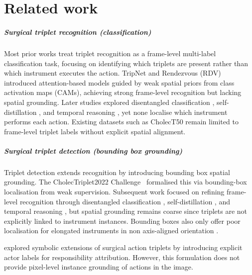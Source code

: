 \documentclass[pdflatex,sn-mathphys-num]{sn-jnl}%
\newcommand{\mysubsection}[1]{\subparagraph{#1}}
\newcommand{\revref}[2]{%
  \marginpar{\raggedright$\scriptstyle R_{#1}C_{#2}$}%
}
\DeclareRobustCommand{\robustrevref}[2]{%
\revref{#1}{#2}
}
\newcommand{\revnew}[1]{%
{\color{orange}#1}\xspace
}
\newcommand{\revref}[2]{\ignorespaces}
\newcommand{\robustrevref}[2]{\ignorespaces}
\newcommand{\revnew}[1]{#1\xspace}
\theoremstyle{thmstyleone}%
\theoremstyle{thmstyletwo}%
\theoremstyle{thmstylethree}%
\begin{document}
\section{Related work}\label{sec::related_works}

\mysubsection{Surgical triplet recognition (classification)} 
Most prior works treat triplet recognition as a frame-level multi-label classification task, focusing on identifying which triplets are present rather than which instrument executes the action. 
TripNet \cite{nwoye2020recognition} and Rendezvous (RDV) \cite{nwoye2022rendezvous} introduced attention-based models guided by weak spatial priors from class activation maps (CAMs), achieving strong frame-level recognition but lacking spatial grounding. 
Later studies explored disentangled classification \cite{chen2023surgical}, self-distillation \cite{yamlahi2023self}, and temporal reasoning \cite{sharma2023rendezvous}, yet none localise which instrument performs each action. 
Existing datasets such as CholecT50 \cite{nwoye2022rendezvous} remain limited to frame-level triplet labels without explicit spatial alignment. 


\mysubsection{Surgical triplet detection (bounding box grounding)}
Triplet detection extends recognition by introducing bounding box spatial grounding. 
The CholecTriplet2022 Challenge~\cite{nwoye2023cholectriplet2022} formalised this via bounding-box localisation from weak supervision. 
Subsequent work focused on refining frame-level recognition through disentangled classification \cite{chen2023surgical}, self-distillation \cite{yamlahi2023self}, and temporal reasoning \cite{sharma2023rendezvous,pei2025instrument} , but spatial grounding remains coarse since triplets are not explicitly linked to instrument instances. 
Bounding boxes also only offer poor localisation for elongated instruments in non axis-aligned orientation \cite{han2025robust}.
\robustrevref{6}{2}\revnew{\cite{younis2024surgical} explored symbolic extensions of surgical action triplets by introducing explicit actor labels for responsibility attribution. However, this formulation does not provide pixel-level instance grounding of actions in the image.}
\end{document}
